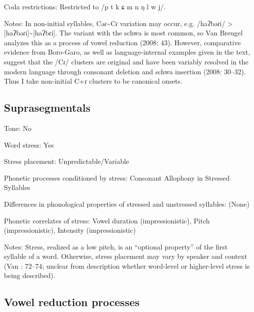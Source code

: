 {\begin{appendixdesc}
\item[Coda restrictions:] Restricted to /p t k ɕ m n ŋ l w j/. 

\item[Notes:] In non-initial syllables, Cəɾ{\textasciitilde}Cɾ variation may occur, e.g. /haʔbəɾi/ > [haʔbəɾi]{\textasciitilde}[haʔbɾi]. The variant with the schwa is most common, so Van Breugel analyzes this as a process of vowel reduction (2008: 43). However, comparative evidence from Boro-Garo, as well as language-internal examples given in the text, suggest that the /Cɾ/ clusters are original and have been variably resolved in the modern language through consonant deletion and schwa insertion (2008: 30--32). Thus I take non-initial C+ɾ clusters to be canonical onsets.
\end{appendixdesc}
\subsection*{Suprasegmentals}
\begin{appendixdesc}
\item[Tone:] No

\item[Word stress:] Yes

\item[Stress placement:] Unpredictable/Variable

\item[Phonetic processes conditioned by stress:] Consonant Allophony in Stressed Syllables

\item[Differences in phonological properties of stressed and unstressed syllables:] (None)

\item[Phonetic correlates of stress:] Vowel duration (impressionistic), Pitch (impressionistic), Intensity (impressionistic)

\item[Notes:] Stress, realized as a low pitch, is an “optional property” of the first syllable of a word. Otherwise, stress placement may vary by speaker and context (Van \citealt{Breugel2008}: 72--74; unclear from description whether word-level or higher-level stress is being described).
\end{appendixdesc}
\subsection*{Vowel reduction processes}
\begin{appendixdesc}


\end{appendixdesc}}
